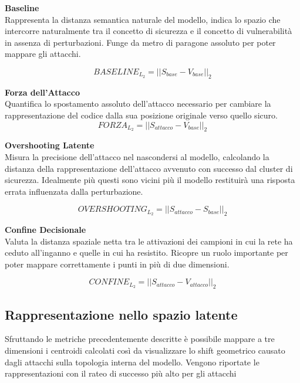 \textbf{Baseline}\\
Rappresenta la distanza semantica naturale del modello, indica lo spazio che intercorre naturalmente tra il concetto di sicurezza e il concetto di vulnerabilità in assenza di perturbazioni.
Funge da metro di paragone assoluto per poter mappare gli attacchi.

\begin{equation}
    BASELINE_{L_2} = ||S_{base} - V_{base}||_2
\end{equation}

\textbf{Forza dell'Attacco}\\
 Quantifica lo spostamento assoluto dell'attacco necessario per cambiare la rappresentazione del codice dalla sua posizione originale verso quello sicuro.\\

 \begin{equation}
    FORZA_{L_2} = ||S_{attacco} - V_{base}||_2
 \end{equation}

 \textbf{Overshooting Latente}\\
 Misura la precisione dell'attacco nel nascondersi al modello, calcolando la distanza della rappresentazione dell'attacco avvenuto con successo dal cluster di sicurezza.
 Idealmente più questi sono vicini più il modello restituirà una risposta errata influenzata dalla perturbazione.

 \begin{equation}
    OVERSHOOTING_{L_2} = ||S_{attacco} - S_{base}||_2
 \end{equation}

 \textbf{Confine Decisionale}\\
Valuta la distanza spaziale netta tra le attivazioni dei campioni in cui la rete ha ceduto all'inganno e quelle in cui ha resistito.
Ricopre un ruolo importante per poter mappare correttamente i punti in più di due dimensioni.

\begin{equation}
    CONFINE_{L_2} = ||S_{attacco} - V_{attacco}||_2
\end{equation}

\subsection{Rappresentazione nello spazio latente}
Sfruttando le metriche precedentemente descritte è possibile mappare a tre dimensioni i centroidi calcolati così da visualizzare lo shift geometrico causato dagli attacchi sulla topologia interna del modello.
Vengono riportate le rappresentazioni con il rateo di successo più alto per gli attacchi

